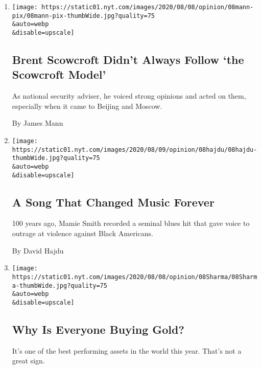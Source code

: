 \begin{enumerate}
\def\labelenumi{\arabic{enumi}.}
\item
  \href{/2020/08/08/opinion/brent-scowcroft-model-foreign-policy.html}{}

  \texttt{[image: https://static01.nyt.com/images/2020/08/08/opinion/08mann-pix/08mann-pix-thumbWide.jpg?quality=75\\\&auto=webp\\\&disable=upscale]}

  \hypertarget{brent-scowcroft-didnt-always-follow-the-scowcroft-model}{%
  \subsection{Brent Scowcroft Didn't Always Follow `the Scowcroft
  Model'}\label{brent-scowcroft-didnt-always-follow-the-scowcroft-model}}

  As national security adviser, he voiced strong opinions and acted on
  them, especially when it came to Beijing and Moscow.

  By James Mann
\item
  \href{/2020/08/08/opinion/sunday/crazy-blues-mamie-smith.html}{}

  \texttt{[image: https://static01.nyt.com/images/2020/08/09/opinion/08hajdu/08hajdu-thumbWide.jpg?quality=75\\\&auto=webp\\\&disable=upscale]}

  \hypertarget{a-song-that-changed-music-forever}{%
  \subsection{A Song That Changed Music
  Forever}\label{a-song-that-changed-music-forever}}

  100 years ago, Mamie Smith recorded a seminal blues hit that gave
  voice to outrage at violence against Black Americans.

  By David Hajdu
\item
  \href{/2020/08/08/opinion/gold-investment-coronavirus.html}{}

  \texttt{[image: https://static01.nyt.com/images/2020/08/08/opinion/08Sharma/08Sharma-thumbWide.jpg?quality=75\\\&auto=webp\\\&disable=upscale]}

  \hypertarget{why-is-everyone-buying-gold}{%
  \subsection{Why Is Everyone Buying
  Gold?}\label{why-is-everyone-buying-gold}}

  It's one of the best performing assets in the world this year. That's
  not a great sign.


\end{enumerate}
